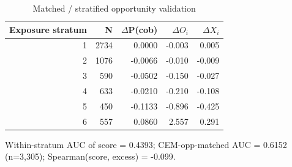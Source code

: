 \begin{table}[htbp]\centering
\caption{Matched / stratified opportunity validation}
\label{tab:opp_matched}
\begin{tabular}{rrrrr}\hline
Exposure stratum & N & $\Delta$P(cob) & $\Delta O_i$ & $\Delta X_i$ \\\hline
1 & 2734 & 0.0000 & -0.003 & 0.005 \\
2 & 1076 & -0.0066 & -0.010 & -0.009 \\
3 & 590 & -0.0502 & -0.150 & -0.027 \\
4 & 633 & -0.0210 & -0.210 & -0.108 \\
5 & 450 & -0.1133 & -0.896 & -0.425 \\
6 & 557 & 0.0860 & 2.557 & 0.291 \\
\hline\end{tabular}
\begin{tablenotes}\footnotesize\item Within-stratum AUC of score = 0.4393; CEM-opp-matched AUC = 0.6152 (n=3,305); Spearman(score, excess) = -0.099.\end{tablenotes}
\end{table}
